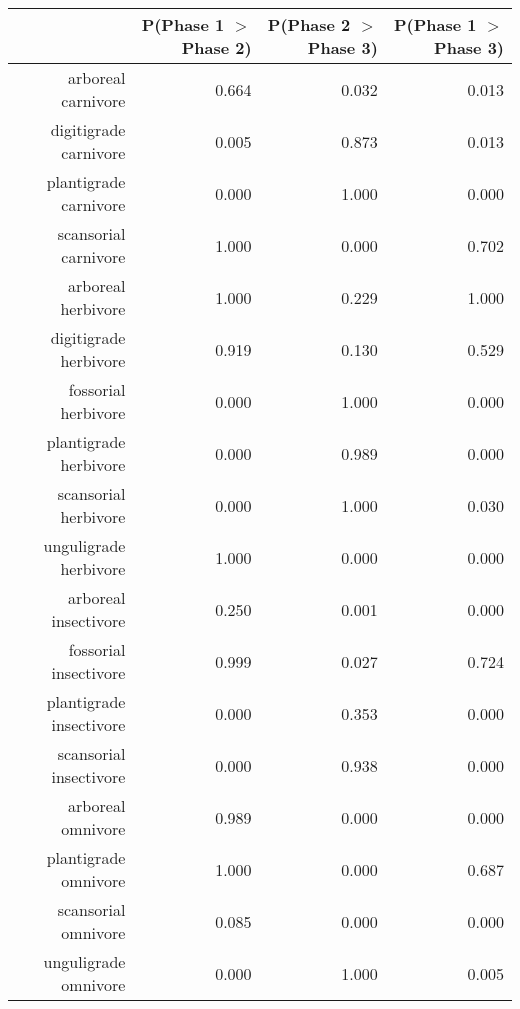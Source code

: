\begin{table}[ht]
\centering
\begin{tabular}{rrrr}
  \hline
 & P(Phase 1 $>$ Phase 2) & P(Phase 2 $>$ Phase 3) & P(Phase 1 $>$ Phase 3) \\ 
  \hline
arboreal carnivore & 0.664 & 0.032 & 0.013 \\ 
  digitigrade carnivore & 0.005 & 0.873 & 0.013 \\ 
  plantigrade carnivore & 0.000 & 1.000 & 0.000 \\ 
  scansorial carnivore & 1.000 & 0.000 & 0.702 \\ 
  arboreal herbivore & 1.000 & 0.229 & 1.000 \\ 
  digitigrade herbivore & 0.919 & 0.130 & 0.529 \\ 
  fossorial herbivore & 0.000 & 1.000 & 0.000 \\ 
  plantigrade herbivore & 0.000 & 0.989 & 0.000 \\ 
  scansorial herbivore & 0.000 & 1.000 & 0.030 \\ 
  unguligrade herbivore & 1.000 & 0.000 & 0.000 \\ 
  arboreal insectivore & 0.250 & 0.001 & 0.000 \\ 
  fossorial insectivore & 0.999 & 0.027 & 0.724 \\ 
  plantigrade insectivore & 0.000 & 0.353 & 0.000 \\ 
  scansorial insectivore & 0.000 & 0.938 & 0.000 \\ 
  arboreal omnivore & 0.989 & 0.000 & 0.000 \\ 
  plantigrade omnivore & 1.000 & 0.000 & 0.687 \\ 
  scansorial omnivore & 0.085 & 0.000 & 0.000 \\ 
  unguligrade omnivore & 0.000 & 1.000 & 0.005 \\ 
   \hline
\end{tabular}
\label{tab:occur_plant}
\end{table}
